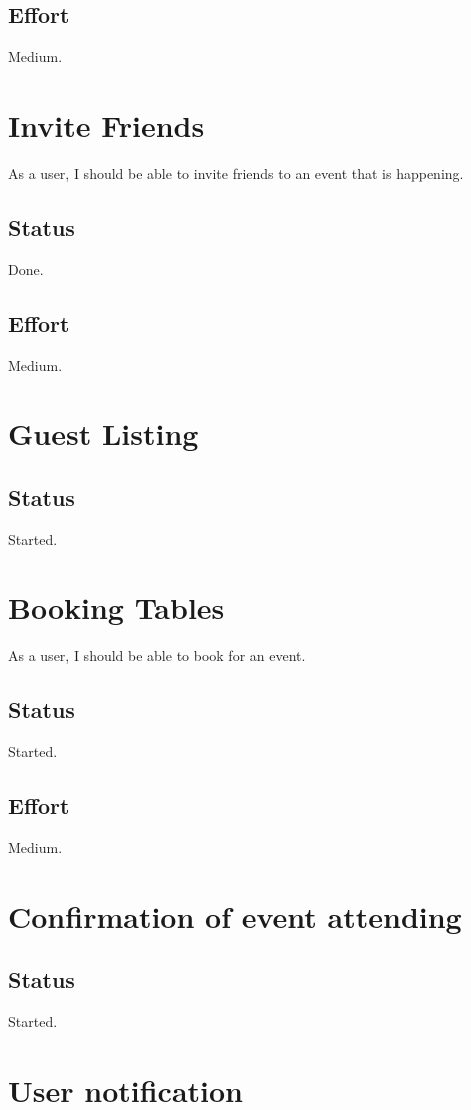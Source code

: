 \documentclass[10pt,a4paper]{article}
\begin{document}
\subsection{Effort}
Medium.

\section{Invite Friends}
As a user, I should be able to invite friends to an event that is happening.
\subsection{Status}
Done.

\subsection{Effort}
Medium.

\section{Guest Listing}

\subsection{Status}
Started.


\section{Booking Tables}
As a user, I should be able to book for an event.
\subsection{Status}
Started.

\subsection{Effort}
Medium.

\section{Confirmation of event attending}

\subsection{Status}
Started.

\section{User notification}
\end{document}
